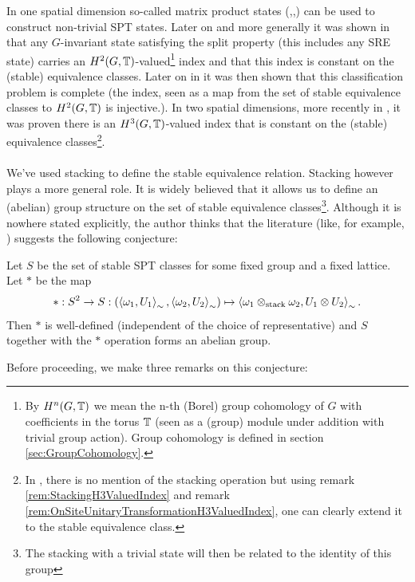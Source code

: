 \documentclass[11pt,a4paper,twoside]{article}
\numberwithin{equation}{section}
\begin{document}
	In one spatial dimension so-called matrix product states (\cite{Chen_2011},\cite{pollman2012symmetry},\cite{schuch2011MatrixProduct}) can be used to construct non-trivial SPT states. Later on and more generally it was shown in \cite{ogata2019classification} that any $G$-invariant state satisfying the split property (this includes any SRE state) carries an $H^2(G,\mathbb T)$-valued\footnote{By $H^n(G,\mathbb T)$ we mean the n-th (Borel) group cohomology of $G$ with coefficients in the torus $\mathbb T$ (seen as a (group) module under addition with trivial group action). Group cohomology is defined in section \ref{sec:GroupCohomology}.} index and that this index is constant on the (stable) equivalence classes. Later on in \cite{kapustin2021classification} it was then shown that this classification problem is complete (the index, seen as a map from the set of stable equivalence classes to $H^2(G,\mathbb T)$ is injective.). In two spatial dimensions, more recently in \cite{ogata2021h3gmathbb}, it was proven there is an $H^3(G,\mathbb T)$-valued index that is constant on the (stable) equivalence classes\footnote{In \cite{ogata2021h3gmathbb}, there is no mention of the stacking operation but using remark \ref{rem:StackingH3ValuedIndex} and remark \ref{rem:OnSiteUnitaryTransformationH3ValuedIndex}, one can clearly extend it to the stable equivalence class.}.
	\\\\
	We've used stacking to define the stable equivalence relation. Stacking however plays a more general role. It is widely believed that it allows us to define an (abelian) group structure on the set of stable equivalence classes\footnote{The stacking with a trivial state will then be related to the identity of this group}. Although it is nowhere stated explicitly, the author thinks that the literature (like, for example, \cite{kapustin2021classification}) suggests the following conjecture:
	\begin{conjecture}\label{conj:StableEquivGroupStructure}
		Let $S$ be the set of stable SPT classes for some fixed group and a fixed lattice. Let $*$ be the map
		\begin{equation}
			*:S^2\rightarrow S:(\expval{\omega_1,U_1}_{\sim},\expval{\omega_2,U_2}_{\sim})\mapsto \expval{\omega_1\otimes_\text{stack}\omega_2,U_1\otimes U_2}_{\sim}.
		\end{equation}
		Then $*$ is well-defined (independent of the choice of representative) and $S$ together with the $*$ operation forms an abelian group.
	\end{conjecture}
	Before proceeding, we make three remarks on this conjecture:
\end{document}
